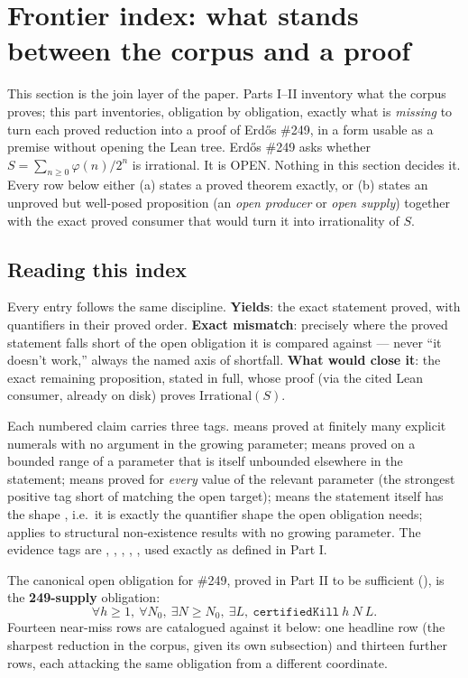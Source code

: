 \section{Frontier index: what stands between the corpus and a proof}

This section is the join layer of the paper. Parts I--II inventory what the corpus proves; this
part inventories, obligation by obligation, exactly what is \emph{missing} to turn each proved
reduction into a proof of Erd\H{o}s \#249, in a form usable as a premise without opening the Lean
tree. Erd\H{o}s \#249 asks whether $S = \sum_{n\ge 0} \varphi(n)/2^n$ is irrational. It is OPEN.
Nothing in this section decides it. Every row below either (a) states a proved theorem exactly, or
(b) states an unproved but well-posed proposition (an \emph{open producer} or \emph{open supply})
together with the exact proved consumer that would turn it into irrationality of $S$.

\subsection{Reading this index}

Every entry follows the same discipline. \textbf{Yields}: the exact statement proved, with
quantifiers in their proved order. \textbf{Exact mismatch}: precisely where the proved statement
falls short of the open obligation it is compared against --- never ``it doesn't work,'' always the
named axis of shortfall. \textbf{What would close it}: the exact remaining proposition, stated in
full, whose proof (via the cited Lean consumer, already on disk) proves $\mathrm{Irrational}(S)$.

Each numbered claim carries three tags.  means proved at finitely many explicit
numerals with no argument in the growing parameter;  means proved on a bounded range
of a parameter that is itself unbounded elsewhere in the statement;  means proved for
\emph{every} value of the relevant parameter (the strongest positive tag short of matching the
open target);  means the statement itself has the shape , i.e.\ it is exactly the quantifier shape the open obligation needs;  applies to
structural non-existence results with no growing parameter. The evidence tags are
, , , , , used exactly as defined in Part I.

The canonical open obligation for \#249, proved in Part II to be sufficient
(), is the
\textbf{249-supply} obligation:
\[
  \forall h \ge 1,\ \forall N_0,\ \exists N \ge N_0,\ \exists L,\ \mathtt{certifiedKill}\ h\ N\ L .
\]
Fourteen near-miss rows are catalogued against it below: one headline row (the sharpest reduction
in the corpus, given its own subsection) and thirteen further rows, each attacking the same
obligation from a different coordinate.

